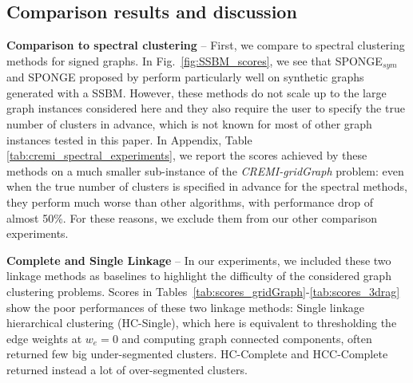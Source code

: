




\subsection{Comparison results and discussion}

\textbf{Comparison to spectral clustering} -- 
First, we compare \algname{} to spectral clustering methods for signed graphs. 
In Fig.~\ref{fig:SSBM_scores}, we see that SPONGE$_{sym}$ and SPONGE proposed by \cite{Cucuringu2019SPONGEAG} perform particularly well on synthetic graphs generated with a SSBM. However, these methods do not scale up to the large graph instances considered here and they also require the user to specify the true number of clusters in advance, which is not known for most of other graph instances tested in this paper. In Appendix, Table \ref{tab:cremi_spectral_experiments}, we report the scores achieved by these methods on a much smaller sub-instance of the \emph{CREMI-gridGraph} problem: even when the true number of clusters is specified in advance for the spectral methods, they perform much worse than other \algname{} algorithms, with performance drop of almost 50\%. For these reasons, we exclude them from our other comparison experiments.  

\textbf{Complete and Single Linkage} -- In our experiments, we included these two linkage methods as baselines to highlight the difficulty of the considered graph clustering problems. Scores in Tables~\ref{tab:scores_gridGraph}-\ref{tab:scores_3drag} show the poor performances of these two linkage methods: Single linkage hierarchical clustering (HC-Single), which here is equivalent to thresholding the edge weights at $w_e=0$ and computing graph connected components, often returned few big under-segmented clusters. HC-Complete and HCC-Complete returned instead a lot of over-segmented clusters. 

